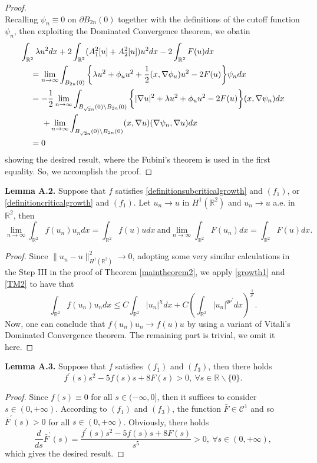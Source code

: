 \documentclass[11pt]{amsart}
\numberwithin{equation}{section}
\theoremstyle{definition}
\newcommand{\R}{\mathbb{R}}
\begin{document}
\begin{proof}
\[\]
Recalling $\psi_n\equiv0$ on $\partial B_{2n}(0)$ together with the definitions of the cutoff function $\psi_n$, then
exploiting the Dominated Convergence theorem, we obatin
\[
\begin{gathered}
 \int_{\R^2}\lambda u^2dx+2\int_{\R^2}(A_1^2[u]+A_2^2[u])u^2dx
-2\int_{\R^2}F(u)dx\hfill\\
\ \ \ \    =\lim_{n\to\infty}\int_{B_{2n}(0)}\bigg\{\lambda u^2+\phi_uu^2+\frac12(x,\nabla\phi_u)u^2-2F(u)\bigg\}\psi_ndx
\hfill\\
\ \ \ \    =-\frac{1}{2}\lim_{n\to\infty}
\int_{B_{\sqrt{2}n}(0)\backslash B_{2n}(0)}\bigg\{|\nabla u|^2+\lambda u^2+\phi_uu^2-2F(u)\bigg\}(x,\nabla\psi_n)dx
\hfill\\
\ \ \ \ \ \ \ \   +\lim_{n\to\infty}\int_{B_{\sqrt{2}n}(0)\backslash B_{2n}(0)}(x,\nabla u)(\nabla\psi_n,\nabla u)dx
\hfill\\
\ \ \ \ =0\hfill\\
\end{gathered}
\]
showing the desired result, where the Fubini's theorem
 is used in the first equality. So, we accomplish the proof.
\end{proof}

\noindent \textbf{Lemma A.2.} Suppose that $f$ satisfies \eqref{definitionsubcriticalgrowth} and $(f_1)$, or
\eqref{definitioncriticalgrowth} and $(f_1)$. Let $u_n\to u$
in $H^1(\R^2)$ and $u_n\to u$ a.e. in $\R^2$,
then
\[
\lim_{n\to\infty}\int_{\R^2}f(u_n)u_ndx=\int_{\R^2}f(u)udx~\text{and}
\lim_{n\to\infty}\int_{\R^2}F(u_n)dx=\int_{\R^2}F(u)dx.
\]

\begin{proof}
Since $\|u_n-u\|^2_{H^1(\R^2)}\to0$, adopting some very similar calculations in the Step III
in the proof of Theorem \ref{maintheorem2}, we apply \eqref{growth1} and \eqref{TM2} to have that
\[
\int_{\R^2}f(u_n)u_ndx\leq C\int_{\R^2}|u_n|^\chi dx+C\left(\int_{\R^2}|u_n|^{q\nu^\prime} dx\right)^{\frac1{\nu^\prime}}.
\]
Now, one can conclude that $f(u_n)u_n\to f(u)u$ by using a variant of Vitali's Dominated Convergence theorem.
The remaining part is trivial, we omit it here.
\end{proof}

\noindent \textbf{Lemma A.3.} Suppose that $f$ satisfies $(f_1)$ and $(f_3)$, then there holds
\[
f^\prime(s)s^2-5f(s)s+8F(s)>0,~\forall s\in\R\backslash\{0\}.
\]
\begin{proof}
Since $f(s)\equiv0$ for all $s\in(-\infty,0]$, then it suffices to consider $s\in(0,+\infty)$.
According to $(f_1)$ and $(f_3)$, the function $\bar{F}\in \mathcal{C}^1$
and so $\bar{F}^\prime(s)>0$ for all $s\in(0,+\infty)$.
Obviously, there holds
\[
\frac d{ds}\bar{F}^\prime(s)=\frac{f^\prime(s)s^2-5f(s)s+8F(s)}{s^5}>0,~\forall s\in(0,+\infty),
\]
which gives the desired result.
\end{proof}
\end{document}
